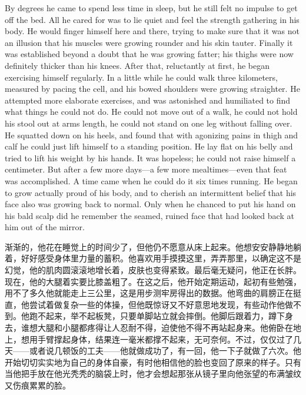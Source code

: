 \begin{paracol}{2}
By degrees he came to spend less time in sleep, but he still felt no
impulse to get off the bed. All he cared for was to lie quiet and feel
the strength gathering in his body. He would finger himself here and
there, trying to make sure that it was not an illusion that his muscles
were growing rounder and his skin tauter. Finally it was established
beyond a doubt that he was growing fatter; his thighs were now
definitely thicker than his knees. After that, reluctantly at first, he
began exercising himself regularly. In a little while he could walk
three kilometers, measured by pacing the cell, and his bowed shoulders
were growing straighter. He attempted more elaborate exercises, and was
astonished and humiliated to find what things he could not do. He could
not move out of a walk, he could not hold his stool out at
arm\textquotesingle s length, he could not stand on one leg without
falling over. He squatted down on his heels, and found that with
agonizing pains in thigh and calf he could just lift himself to a
standing position. He lay flat on his belly and tried to lift his weight
by his hands. It was hopeless; he could not raise himself a centimeter.
But after a few more days---a few more mealtimes---even that feat was
accomplished. A time came when he could do it six times running. He
began to grow actually proud of his body, and to cherish an intermittent
belief that his face also was growing back to normal. Only when he
chanced to put his hand on his bald scalp did he remember the seamed,
ruined face that had looked back at him out of the mirror.

\switchcolumn

渐渐的，他花在睡觉上的时间少了，但他仍不愿意从床上起来。他想安安静静地躺着，好好感受身体里力量的蓄积。他喜欢用手摸摸这里，弄弄那里，以确定这不是幻觉，他的肌肉圆滚滚地增长着，皮肤也变得紧致。最后毫无疑问，他正在长胖。现在，他的大腿着实要比膝盖粗了。在这之后，他开始定期运动，起初有些勉强，用不了多久他就能走上三公里，这是用步测牢房得出的数据。他弯曲的肩膀正在挺直，他尝试着做复杂一些的体操，但他既惊讶又不好意思地发现，有些动作他做不到。他跑不起来，举不起板凳，只要单脚站立就会摔倒。他脚后跟着力，蹲下身去，谁想大腿和小腿都疼得让人忍耐不得，迫使他不得不再站起身来。他俯卧在地上，想用手臂撑起身体，结果连一毫米都撑不起来，无可奈何。不过，仅仅过了几天——或者说几顿饭的工夫——他就做成功了，有一回，他一下子就做了六次。他开始切切实实地为自己的身体自豪，有时他相信他的脸也变回了原来的样子。只有当他把手放在他光秃秃的脑袋上时，他才会想起那张从镜子里向他张望的布满皱纹又伤痕累累的脸。

\switchcolumn*


\end{paracol}
